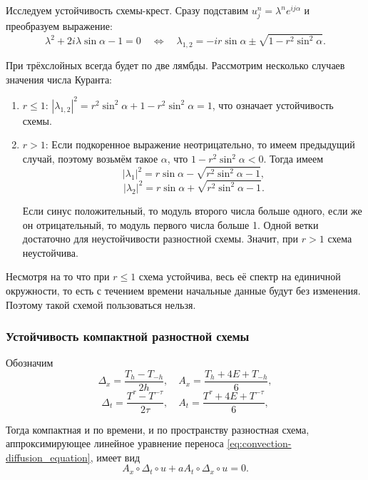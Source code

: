 \documentclass{article}
\begin{document}
\begin{example}
	Исследуем устойчивость схемы-крест. Сразу подставим
	$u_j^n=\lambda^ne^{ij\alpha}$ и преобразуем выражение:
	\[\lambda^2+2i\lambda\sin\alpha-1=0\quad\Leftrightarrow\quad
	\lambda_{1,2}=-ir\sin\alpha\pm\sqrt{1-r^2\sin^2\alpha}.\]

	При трёхслойных всегда будет по две лямбды. Рассмотрим несколько
	случаев значения числа Куранта:
	\begin{enumerate}[nosep]
		\item $r\le 1$: $|\lambda_{1,2}|^2=r^2\sin^2\alpha+1-
			r^2\sin^2\alpha=1$, что означает устойчивость схемы.
		\item $r>1$: Если подкоренное выражение неотрицательно, то
			имеем предыдущий случай, поэтому возьмём такое $\alpha$,
			что $1-r^2\sin^2\alpha < 0$. Тогда имеем
			\[|\lambda_1|^2=r\sin\alpha-\sqrt{r^2\sin^2\alpha-1},\]
			\[|\lambda_2|^2=r\sin\alpha+\sqrt{r^2\sin^2\alpha-1}.\]

			Если синус положительный, то модуль второго числа больше
			одного, если же он отрицательный, то модуль первого
			числа больше 1. Одной ветки достаточно для
			неустойчивости разностной схемы. Значит, при $r>1$ схема
			неустойчива.
	\end{enumerate}

	Несмотря на то что при $r\le 1$ схема устойчива, весь её спектр на
	единичной окружности, то есть с течением времени начальные данные будут
	без изменения. Поэтому такой схемой пользоваться нельзя.
\end{example}

\subsubsection{Устойчивость компактной разностной схемы}
\begin{define}
	Обозначим
	\[\Delta_x=\frac{T_h-T_{-h}}{2h},\quad A_x=\frac{T_h+4E+T_{-h}}{6},\]
	\[\Delta_t=\frac{T^\tau-T^{-\tau}}{2\tau},\quad A_t=\frac{T^\tau+4E+
	T^{-\tau}}{6},\]

	Тогда компактная и по времени, и по пространству разностная схема,
	аппроксимирующее линейное уравнение переноса
	\eqref{eq:convection-diffusion_equation}, имеет вид
	\[A_x\circ\Delta_t\circ u+aA_t\circ\Delta_x\circ u=0.\]
\end{define}
\end{document}
